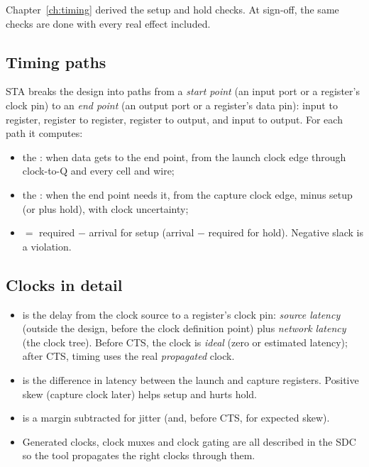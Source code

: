 Chapter~\ref{ch:timing} derived the setup and hold checks. At sign-off, the same checks are done with every real effect included.

\subsection*{Timing paths}

STA breaks the design into paths from a \emph{start point} (an input port or a register's clock pin) to an \emph{end point} (an output port or a register's data pin): input to register, register to register, register to output, and input to output. For each path it computes:
\begin{itemize}
  \item the : when data gets to the end point, from the launch clock edge through clock-to-Q and every cell and wire;
  \item the : when the end point needs it, from the capture clock edge, minus setup (or plus hold), with clock uncertainty;
  \item {} $=$ required $-$ arrival for setup (arrival $-$ required for hold). Negative slack is a violation.
\end{itemize}

\subsection*{Clocks in detail}

\begin{itemize}
  \item {} is the delay from the clock source to a register's clock pin: \emph{source latency} (outside the design, before the clock definition point) plus \emph{network latency} (the clock tree). Before CTS, the clock is \emph{ideal} (zero or estimated latency); after CTS, timing uses the real \emph{propagated} clock.
  \item {} is the difference in latency between the launch and capture registers. Positive skew (capture clock later) helps setup and hurts hold.
  \item {} is a margin subtracted for jitter (and, before CTS, for expected skew).
  \item Generated clocks, clock muxes and clock gating are all described in the SDC so the tool propagates the right clocks through them.
\end{itemize}

